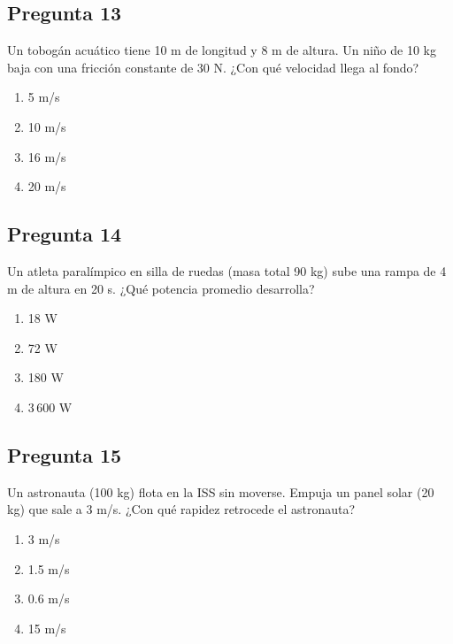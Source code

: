 \begin{preguntabox}
\subsection{Pregunta 13}
Un tobogán acuático tiene 10 m de longitud y 8 m de altura. Un niño de 10 kg baja con una fricción constante de 30 N. ¿Con qué velocidad llega al fondo?

\begin{enumerate}
    \item[A)] 5 m/s
    \item[B)] 10 m/s
    \item[C)] 16 m/s
    \item[D)] 20 m/s
\end{enumerate}
\end{preguntabox}

\begin{preguntabox}
\subsection{Pregunta 14}
Un atleta paralímpico en silla de ruedas (masa total 90 kg) sube una rampa de 4 m de altura en 20 s. ¿Qué potencia promedio desarrolla?

\begin{enumerate}
    \item[A)] 18 W
    \item[B)] 72 W
    \item[C)] 180 W
    \item[D)] 3\,600 W
\end{enumerate}
\end{preguntabox}

\begin{preguntabox}
\subsection{Pregunta 15}
Un astronauta (100 kg) flota en la ISS sin moverse. Empuja un panel solar (20 kg) que sale a 3 m/s. ¿Con qué rapidez retrocede el astronauta?

\begin{enumerate}
    \item[A)] 3 m/s
    \item[B)] 1.5 m/s
    \item[C)] 0.6 m/s
    \item[D)] 15 m/s
\end{enumerate}
\end{preguntabox}

